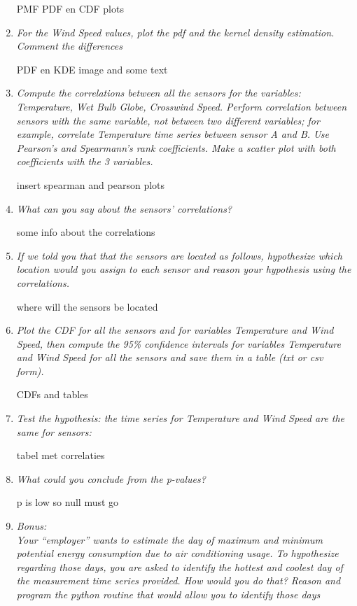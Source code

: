 \documentclass[a4paper,12pt]{article} %
\begin{document}
\begin{enumerate}
PMF PDF en CDF plots 

\item {\it For the Wind Speed values, plot the pdf and the kernel density estimation. Comment the differences}

PDF en KDE image and some text 

\item {\it Compute the correlations between all the sensors for the variables: Temperature, Wet Bulb Globe, Crosswind Speed. Perform correlation between sensors with the same variable, not between two different variables; for example, correlate Temperature time series between sensor A and B. Use Pearson’s and Spearmann’s rank coefficients. Make a scatter plot with both coefficients with the 3 variables.}

insert spearman and pearson plots 

\item {\it What can you say about the sensors’ correlations?}

some info about the correlations 

\item {\it If we told you that that the sensors are located as follows, hypothesize which location would you assign to each sensor and reason your hypothesis using the correlations.}


where will the sensors be located

\item {\it Plot the CDF for all the sensors and for variables Temperature and Wind Speed, then compute the 95\% confidence intervals for variables Temperature and Wind Speed for all the sensors and save them in a table (txt or csv form).}

CDFs and tables 

\item {\it Test the hypothesis: the time series for Temperature and Wind Speed are the same for sensors:}

tabel met correlaties 

\item {\it What could you conclude from the p-values?}

p is low so null must go 

\item {\it Bonus:\\ Your “employer” wants to estimate the day of maximum and minimum potential energy consumption due to air conditioning usage. To hypothesize regarding those days, you are asked to identify the hottest and coolest day of the measurement time series provided. How would you do that? Reason and program the python routine that would allow you to identify those days}


\end{enumerate}
\end{document}
